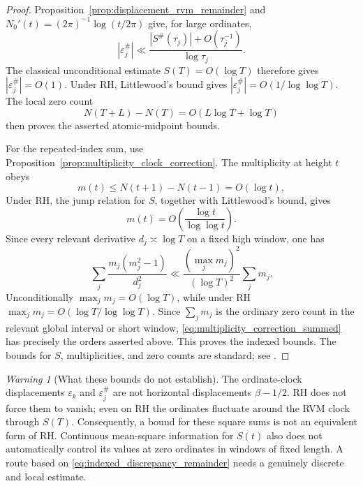 \documentclass[11pt]{amsart}
\numberwithin{equation}{section}
\theoremstyle{plain}
\theoremstyle{definition}
\theoremstyle{remark}
\newtheorem{warning}[theorem]{Warning}
\newcommand{\1}{\mathbf{1}}
\begin{document}
\begin{proof}
Proposition~\ref{prop:displacement_rvm_remainder} and
\(N_0'(t)=(2\pi)^{-1}\log(t/2\pi)\) give, for large ordinates,
\begin{equation}
|\varepsilon_j^{\#}|
\ll
\frac{|S^{\#}(\tau_j)|+O(\tau_j^{-1})}{\log\tau_j}.
\label{eq:rvm_epsilon_bound_from_S}
\end{equation}
The classical unconditional estimate \(S(T)=O(\log T)\) therefore gives
\(|\varepsilon_j^{\#}|=O(1)\).  Under RH, Littlewood's bound gives
\(|\varepsilon_j^{\#}|=O(1/\log\log T)\).  The local zero count
\begin{equation}
N(T+L)-N(T)=O(L\log T+\log T)
\label{eq:rvm_local_zero_count}
\end{equation}
then proves the asserted atomic-midpoint bounds.

For the repeated-index sum, use
Proposition~\ref{prop:multiplicity_clock_correction}.  The multiplicity at
height \(t\) obeys
\begin{equation}
m(t)\leq N(t+1)-N(t-1)=O(\log t),
\label{eq:multiplicity_crude_bound}
\end{equation}
Under RH, the jump relation for \(S\), together with Littlewood's bound,
gives
\begin{equation}
m(t)=O\!\left(\frac{\log t}{\log\log t}\right).
\label{eq:multiplicity_RH_bound}
\end{equation}
Since every relevant derivative
\(d_j\asymp\log T\) on a fixed high window, one has
\begin{equation}
\sum_j\frac{m_j(m_j^2-1)}{d_j^2}
\ll
\frac{(\max_j m_j)^2}{(\log T)^2}\sum_jm_j.
\label{eq:multiplicity_correction_summed}
\end{equation}
Unconditionally \(\max_jm_j=O(\log T)\), while under RH
\(\max_jm_j=O(\log T/\log\log T)\).  Since \(\sum_jm_j\) is the
ordinary zero count in the relevant global interval or short window,
\eqref{eq:multiplicity_correction_summed} has precisely the orders asserted
above.  This proves the indexed bounds.  The
bounds for \(S\), multiplicities, and zero counts are standard; see
\cite[Chapters~9 and~14]{Titchmarsh1986}.
\end{proof}

\begin{warning}[What these bounds do not establish]
\label{warn:rvm_square_sum_not_RH}
The ordinate-clock displacements \(\varepsilon_k\) and
\(\varepsilon_j^{\#}\) are not horizontal displacements
\(\beta-1/2\).  RH does not force them to vanish; even on RH the ordinates
fluctuate around the RVM clock through \(S(T)\).  Consequently, a bound for
these square sums is not an equivalent form of RH.  Continuous mean-square
information for \(S(t)\) also does not automatically control its values at
zero ordinates in windows of fixed length.  A route based on
\eqref{eq:indexed_discrepancy_remainder} needs a genuinely discrete and
local estimate.
\end{warning}
\end{document}
